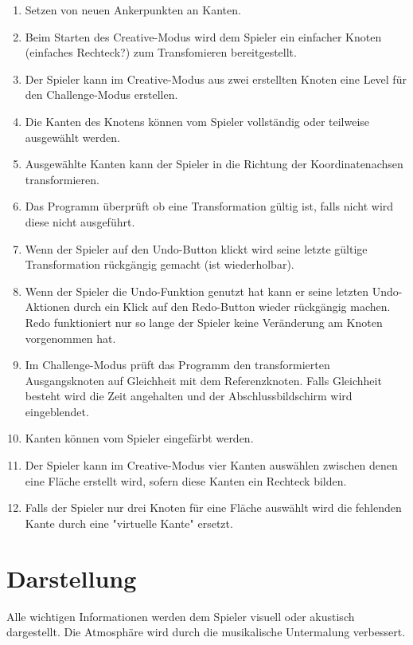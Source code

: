 \begin{enumerate}[resume]
\item Setzen von neuen Ankerpunkten an Kanten. %

\item Beim Starten des Creative-Modus wird dem Spieler ein einfacher Knoten (einfaches Rechteck?) zum Transfomieren bereitgestellt.
\item Der Spieler kann im Creative-Modus aus zwei erstellten Knoten eine Level für den Challenge-Modus erstellen.
\item Die Kanten des Knotens können vom Spieler vollständig oder teilweise ausgewählt werden.
\item Ausgewählte Kanten kann der Spieler in die Richtung der Koordinatenachsen transformieren.
\item Das Programm überprüft ob eine Transformation gültig ist, falls nicht wird diese nicht ausgeführt.
\item Wenn der Spieler auf den Undo-Button klickt wird seine letzte gültige Transformation rückgängig gemacht (ist wiederholbar).
\item Wenn der Spieler die Undo-Funktion genutzt hat kann er seine letzten Undo-Aktionen durch ein Klick auf den Redo-Button wieder rückgängig machen. Redo funktioniert nur so lange der Spieler keine Veränderung am Knoten vorgenommen hat.
\item Im Challenge-Modus prüft das Programm den transformierten Ausgangsknoten auf Gleichheit mit dem Referenzknoten. Falls Gleichheit besteht wird die Zeit angehalten und der Abschlussbildschirm wird eingeblendet.
\item Kanten können vom Spieler eingefärbt werden.
\item Der Spieler kann im Creative-Modus vier Kanten auswählen zwischen denen eine Fläche erstellt wird, sofern diese Kanten ein Rechteck bilden.
\item Falls der Spieler nur drei Knoten für eine Fläche auswählt wird  die fehlenden Kante durch eine "virtuelle Kante" ersetzt.

\end{enumerate}

\section{Darstellung}
Alle wichtigen Informationen werden dem Spieler visuell oder akustisch dargestellt. Die Atmosphäre wird durch die musikalische Untermalung verbessert.

